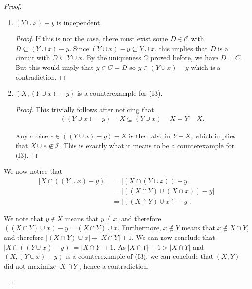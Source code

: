 \begin{proof}
\begin{enumerate}
\begin{enumerate}
\begin{enumerate}
              \item $(Y \cup x) - y$ is independent. 

                \begin{proof}
                If this is not the case, there must exist some $D \in \mathcal C$ with $D \subseteq (Y \cup x) - y$. Since $(Y \cup x) - y \subseteq Y \cup x$, this implies that $D$ is a circuit with $D \subseteq Y \cup x$. By the uniqueness $C$ proved before, we have $D = C$. But this would imply that $y\in C = D$ so $y \in (Y \cup x) - y$ which is a contradiction.  
                \end{proof}

              \item $(X, (Y \cup x) - y)$ is a counterexample for (I3).

                \begin{proof}
                  This trivially follows after noticing that 
                  \begin{align*}
                  ((Y \cup x) - y) - X \subseteq (Y \cup x) - X = Y - X.
                  \end{align*}

                  Any choice $e \in ((Y \cup x) - y) - X$ is then also in $Y-X$, which implies that $X\cup e\notin \mathcal{I}$. This is exactly what it means to be a counterexample for (I3).
                \end{proof}
            \end{enumerate}

            We now notice that
            \begin{align*}
              |X \cap ((Y \cup x) - y)| &= |(X \cap (Y \cup x)) - y| 
              \\&=  |((X \cap Y) \cup (X \cap x)) - y|
              \\&=  |((X \cap Y) \cup x) - y|.
            \end{align*}

              We note that $y \notin X$ means that $y \neq x$, and therefore $((X \cap Y) \cup x) - y = (X \cap Y) \cup x$. Furthermore, $x\notin Y$ means that $x\not\in X \cap Y$, and therefore $|(X \cap Y) \cup x| = |X \cap Y| + 1$. We can now conclude that $|X \cap ((Y \cup x) - y)| = |X \cap Y| + 1$. As $|X \cap Y| + 1 > |X \cap Y|$ and $(X, (Y \cup x) - y)$ is a counterexample of (I3), we can conclude that $(X, Y)$ did not maximize $|X \cap Y|$, hence a contradiction.
    \end{enumerate}
\end{enumerate}



\end{proof}
